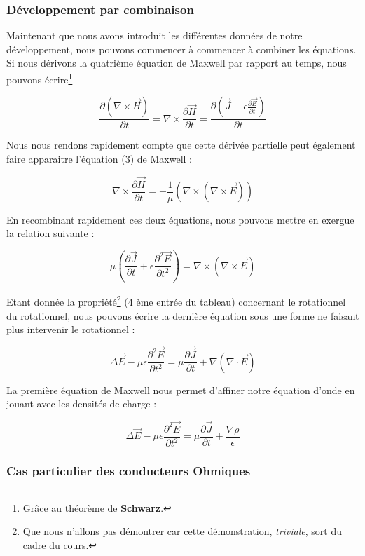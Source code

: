 \documentclass[a4paper,12pt]{article}
\begin{document}
\subsubsection{Développement par combinaison}

Maintenant que nous avons introduit les différentes données de notre développement, nous pouvons commencer à commencer à combiner les équations. 
Si nous dérivons la quatrième équation de Maxwell par rapport au temps, nous pouvons écrire\footnote{Grâce au théorème de \textbf{Schwarz}.} 

\[ \frac{\partial (\nabla \times \vec{H})}{\partial t} = \nabla \times \frac{\partial \vec{H}}{\partial t} = \frac{\partial(\vec{J} + \epsilon \frac{\partial \vec{E}}{\partial t})}{\partial t} \]

Nous nous rendons rapidement compte que cette dérivée partielle peut également faire apparaitre l'équation (3) de Maxwell : 

\[ \nabla \times \frac{\partial \vec{H}}{\partial t} = -\frac{1}{\mu}( \nabla \times (\nabla \times \vec{E}))\]

En recombinant rapidement ces deux équations, nous pouvons mettre en exergue la relation suivante : 

\[\mu(\frac{\partial \vec{J}}{\partial t} + \epsilon \frac{\partial^{2} \vec{E}}{\partial t^{2}}) = \nabla \times (\nabla \times \vec{E})\]

\newpage

Etant donnée la propriété\footnote{Que nous n'allons pas démontrer car cette démonstration, \textit{triviale}, sort du cadre du cours.} (4 ème entrée du tableau) concernant le rotationnel du rotationnel, 
nous pouvons écrire la dernière équation sous une forme ne faisant plus intervenir le rotationnel : 

\[ \Delta \vec{E} - \mu \epsilon  \frac{\partial^{2} \vec{E}}{\partial t^{2}} = \mu \frac{\partial \vec{J}}{\partial t} + \nabla(\nabla \cdot \vec{E}) \]

La première équation de Maxwell nous permet d'affiner notre équation d'onde en jouant avec les densités de charge : 

\[ \Delta \vec{E} - \mu \epsilon  \frac{\partial^{2} \vec{E}}{\partial t^{2}} = \mu \frac{\partial \vec{J}}{\partial t} + \frac{\nabla \rho}{\epsilon} \]

\subsubsection{Cas particulier des conducteurs Ohmiques}
\end{document}

